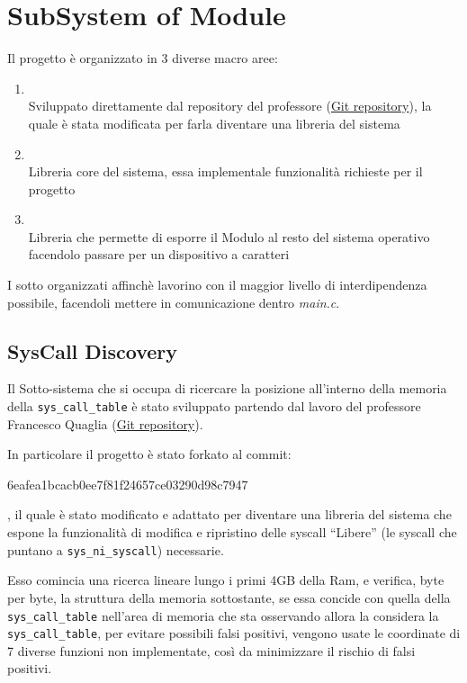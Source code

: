 \section{SubSystem of Module}

Il progetto è organizzato in 3 diverse macro aree:
\begin{enumerate}
\item {} \\
    Sviluppato direttamente dal repository del professore
    (\href{https://github.com/FrancescoQuaglia/Linux-sys_call_table-discoverer}{Git repository}), la quale è stata
    modificata per farla diventare una libreria del sistema
\item {} \\
    Libreria core del sistema, essa implementale funzionalità richieste per il progetto
\item {} \\
    Libreria che permette di esporre il Modulo al resto del sistema operativo facendolo passare per un dispositivo a
    caratteri
\end{enumerate}

I sotto organizzati affinchè lavorino con il maggior livello di interdipendenza possibile, facendoli mettere in
comunicazione dentro \textit{main.c}.

\subsection{SysCall Discovery} \label{SysCallDiscovery}
Il Sotto-sistema che si occupa di ricercare la posizione all'interno della memoria della \verb|sys_call_table| è stato
sviluppato partendo dal lavoro del professore Francesco Quaglia
(\href{https://github.com/FrancescoQuaglia/Linux-sys_call_table-discoverer}{Git repository}).

In particolare il progetto è stato forkato al commit:
\begin{verb}6eafea1bcacb0ee7f81f24657ce03290d98c7947\end{verb}, il quale è stato modificato e
adattato per diventare una libreria del sistema che espone la funzionalità di modifica e ripristino delle syscall
``Libere'' (le syscall che puntano a \verb|sys_ni_syscall|) necessarie.

Esso comincia una ricerca lineare lungo i primi 4GB della Ram, e verifica, byte per byte, la struttura della memoria
sottostante, se essa concide con quella della \verb|sys_call_table| nell'area di memoria che sta osservando allora la
considera la \verb|sys_call_table|, per evitare possibili falsi positivi, vengono usate le coordinate di 7 diverse
funzioni non implementate, così da minimizzare il rischio di falsi positivi.

